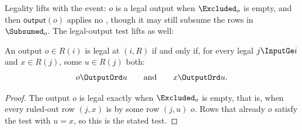 Legality lifts with the event: $o$ is a legal output when $\Excluded_o$ is
empty, and then $\mathsf{output}(o)$ applies no \commitment, though it may
still subsume the rows in $\Subsumed_o$.  The legal-output test lifts as well:

\begin{proposition}
\label{prop:exposability}
An output $o\in R(i)$ is legal at $(i,R)$ if and only if, for every legal
$j\InputGe i$ and $x\in R(j)$, some $u\in R(j)$ \outrel both:
\begin{equation}
  o\OutputOrd u
  \qquad\text{and}\qquad
  x\OutputOrd u.
  \label{eq:safe-exposure}
\end{equation}
\end{proposition}

\begin{proof}
The output $o$ is legal exactly when $\Excluded_o$ is empty, that is, when
every ruled-out row $(j,x)$ is \outrelpast by some row $(j,u)$ \outrelpart
$o$.  Rows that already \outrelbase $o$ satisfy the test with $u=x$, so this
is the stated test.
\end{proof}
